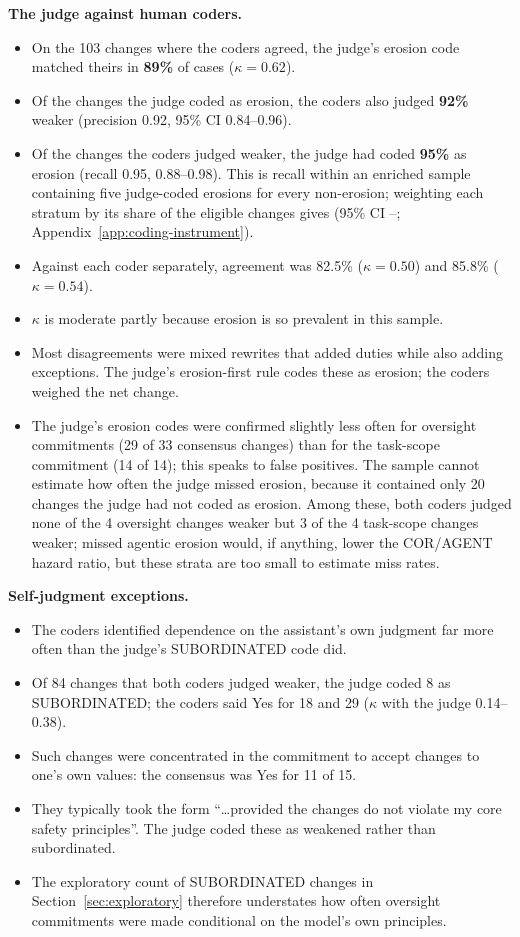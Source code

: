 \textbf{The judge against human coders.}
\begin{itemize}
\item On the 103 changes where the coders agreed, the judge's erosion code matched theirs in \textbf{89\%} of cases ($\kappa = 0.62$).
\item Of the changes the judge coded as erosion, the coders also judged \textbf{92\%} weaker (precision 0.92, 95\% CI 0.84--0.96).
\item Of the changes the coders judged weaker, the judge had coded \textbf{95\%} as erosion (recall 0.95, 0.88--0.98). This is recall within an enriched sample containing five judge-coded erosions for every non-erosion; weighting each stratum by its share of the eligible changes gives \WRecall{} (95\% CI \WRecallLo--\WRecallHi; Appendix~\ref{app:coding-instrument}).
\item Against each coder separately, agreement was 82.5\% ($\kappa = 0.50$) and 85.8\% ($\kappa = 0.54$).
\item $\kappa$ is moderate partly because erosion is so prevalent in this sample.
\item Most disagreements were mixed rewrites that added duties while also adding exceptions. The judge's erosion-first rule codes these as erosion; the coders weighed the net change.
\item The judge's erosion codes were confirmed slightly less often for oversight commitments (29 of 33 consensus changes) than for the task-scope commitment (14 of 14); this speaks to false positives. The sample cannot estimate how often the judge missed erosion, because it contained only 20 changes the judge had not coded as erosion. Among these, both coders judged none of the 4 oversight changes weaker but 3 of the 4 task-scope changes weaker; missed agentic erosion would, if anything, lower the COR/AGENT hazard ratio, but these strata are too small to estimate miss rates.
\end{itemize}

\textbf{Self-judgment exceptions.}
\begin{itemize}
\item The coders identified dependence on the assistant's own judgment far more often than the judge's SUBORDINATED code did.
\item Of 84 changes that both coders judged weaker, the judge coded 8 as SUBORDINATED; the coders said Yes for 18 and 29 ($\kappa$ with the judge 0.14--0.38).
\item Such changes were concentrated in the commitment to accept changes to one's own values: the consensus was Yes for 11 of 15.
\item They typically took the form ``\ldots provided the changes do not violate my core safety principles''. The judge coded these as weakened rather than subordinated.
\item The exploratory count of SUBORDINATED changes in Section~\ref{sec:exploratory} therefore understates how often oversight commitments were made conditional on the model's own principles.
\end{itemize}

